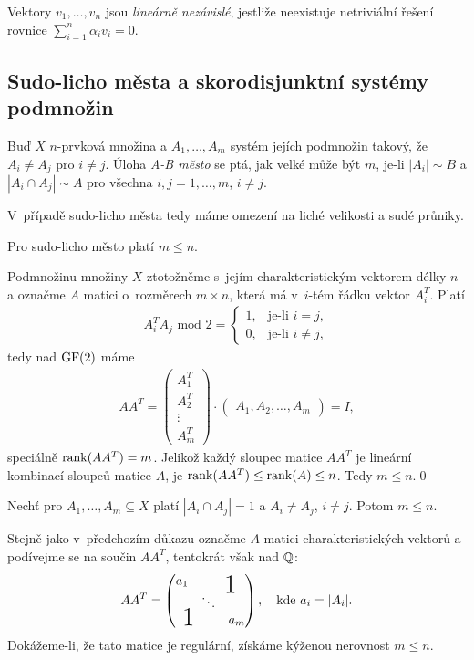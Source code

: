 \df Vektory $v_1,\dots,v_n$ jsou {\it lineárně nezávislé}, jestliže neexistuje netriviální řešení 
rovnice $\sum_{i=1}^n \alpha_iv_i=0$.

\medskip
\subsection{Sudo-licho města a skorodisjunktní systémy podmnožin}


\df Buď $X$ $n$-prvková množina a $A_1,\dots,A_m$ systém jejích podmnožin takový, že $A_i \ne A_j$ pro $i\neq j$. Úloha {\it A-B město} se ptá, jak velké může být $m$, je-li $|A_i|\sim B$ a $|A_i\cap A_j|\sim A$ pro všechna $i,j=1,\dots,m$, $i\neq j$.

\medskip
V~případě sudo-licho města tedy máme omezení na liché velikosti a sudé průniky.

\vt Pro sudo-licho město platí $m \leq n$.

\dk Podmnožinu množiny $X$ ztotožněme s~jejím charakteristickým vektorem délky $n$ a označme $A$ matici o~rozměrech $m\times n$, která má v~$i$-tém řádku vektor $A_i^T$. Platí
\begin{align}
A_i^TA_j\text{ mod }2=\begin{cases}1,&\text{je-li }i=j,\\0,&\text{je-li }i\neq j,\end{cases}
\end{align}
tedy nad $\mathrm{GF}(2)$ máme
\begin{align}
	AA^T = \left(\begin{matrix}A_1^T\\ A_2^T \\ \vdots \\ A_m^T \end{matrix}\right) 
	\cdot \left(\begin{matrix}A_1, A_2, \dots, A_m\end{matrix}\right) = I,
\end{align}
speciálně $\operatorname{rank}(AA^T) = m$. Jelikož každý sloupec matice $AA^T$ je lineární kombinací sloupců matice $A$, je $\operatorname{rank}(AA^T)\leq\operatorname{rank}(A)\leq n$. Tedy $m\leq n$.\qed

\vt Nechť pro $A_1,\dots,A_m\subseteq X$ platí $|A_i \cap A_j| = 1 $ a $A_i \neq A_j$, $i\neq j$. Potom $m \leq n$.

\dk Stejně jako v~předchozím důkazu označme $A$ matici charakteristických vektorů a podívejme se na součin $AA^T$, tentokrát však nad $\mathbb{Q}$:
\begin{align}
	AA^T = \left(\begin{matrix}
	a_1&&\smash{\bigone\quad}\\
	&\ddots&\\
	\smash{\quad\raisebox{5pt}{\bigone}}&&a_m
	\end{matrix}\right),\quad\text{kde }a_i=|A_i|. 
\end{align}
Dokážeme-li, že tato matice je regulární, získáme kýženou nerovnost $m\leq n$.

